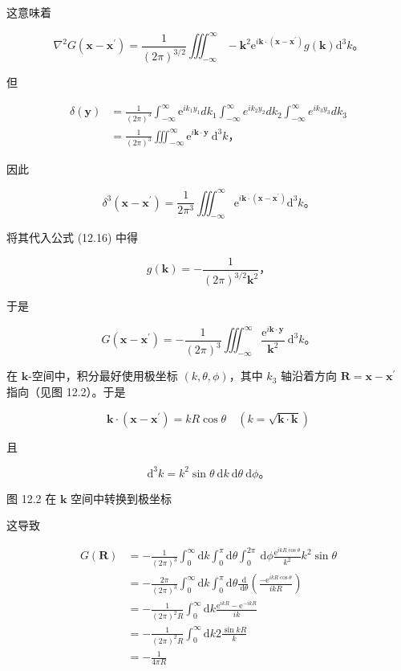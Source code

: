 这意味着

\[\nabla^{2}G\left( \mathbf{x} - \mathbf{x}^{\prime} \right) = \frac{1}{(2\pi)^{3/2}}\iiint_{- \infty}^{\infty} - \mathbf{k}^{2}\mathrm{e}^{i\mathbf{k} \cdot \left( \mathbf{x} - \mathbf{x}^{\prime} \right)}g\left( \mathbf{k} \right)\mathrm{d}^{3}k。\]

但

\[\begin{aligned}
\delta\left( \mathbf{y} \right) & = \frac{1}{(2\pi)^{3}}\int_{- \infty}^{\infty}\mathrm{e}^{ik_{1}y_{1}}dk_{1}\int_{- \infty}^{\infty}e^{ik_{2}y_{2}}dk_{2}\int_{- \infty}^{\infty}e^{ik_{3}y_{3}}dk_{3} \\
 & = \frac{1}{(2\pi)^{3}}\iiint_{- \infty}^{\infty}\mathrm{e}^{i\mathbf{k} \cdot \mathbf{y}}\mathrm{\: d}^{3}k，
\end{aligned}\]

因此

\[\delta^{3}\left( \mathbf{x} - \mathbf{x}^{\prime} \right) = \frac{1}{2\pi^{3}}\iiint_{- \infty}^{\infty}\mathrm{e}^{i\mathbf{k} \cdot \left( \mathbf{x} - \mathbf{x}^{\prime} \right)}\mathrm{d}^{3}k。\]

将其代入公式 (12.16) 中得

\[g\left( \mathbf{k} \right) = - \frac{1}{(2\pi)^{3/2}\mathbf{k}^{2}}，\]

于是

\[G\left( \mathbf{x} - \mathbf{x}^{\prime} \right) = - \frac{1}{(2\pi)^{3}}\iiint_{- \infty}^{\infty}\frac{\mathrm{e}^{i\mathbf{k} \cdot \mathbf{y}}}{\mathbf{k}^{2}}\mathrm{\: d}^{3}k。\]

在 \(\mathbf{k}\)-空间中，积分最好使用极坐标 \((k,\theta,\phi)\)，其中
\(k_{3}\) 轴沿着方向 \(\mathbf{R} = \mathbf{x} - \mathbf{x}^{\prime}\)
指向（见图 12.2）。于是

\[\mathbf{k} \cdot \left( \mathbf{x} - \mathbf{x}^{\prime} \right) = kR\cos\theta\quad\left( k = \sqrt{\mathbf{k} \cdot \mathbf{k}} \right)\]

且

\[\mathrm{d}^{3}k = k^{2}\sin\theta\mathrm{\: d}k\mathrm{\: d}\theta\mathrm{\: d}\phi 。\]

图 12.2 在 \(\mathbf{k}\) 空间中转换到极坐标

这导致

\[\begin{aligned}
G\left( \mathbf{R} \right) & = - \frac{1}{(2\pi)^{3}}\int_{0}^{\infty}\mathrm{d}k\int_{0}^{\pi}\mathrm{d}\theta\int_{0}^{2\pi}\mathrm{\: d}\phi\frac{\mathrm{e}^{ikR\cos\theta}}{k^{2}}k^{2}\sin\theta \\
 & = - \frac{2\pi}{(2\pi)^{3}}\int_{0}^{\infty}\mathrm{d}k\int_{0}^{\pi}\mathrm{d}\theta\frac{\mathrm{\: d}}{\mathrm{\: d}\theta}\left( \frac{- \mathrm{e}^{ikR\cos\theta}}{ikR} \right) \\
 & = - \frac{1}{(2\pi)^{2}R}\int_{0}^{\infty}\mathrm{d}k\frac{\mathrm{e}^{ikR} - \mathrm{e}^{- ikR}}{ik} \\
 & = - \frac{1}{(2\pi)^{2}R}\int_{0}^{\infty}\mathrm{d}k2\frac{\sin kR}{k} \\
 & = - \frac{1}{4\pi R}
\end{aligned}\]

